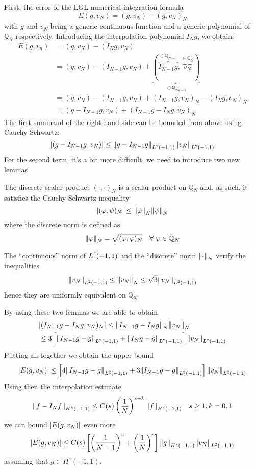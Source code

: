 First, the error of the LGL numerical integration formula 
\[
    E(g, v_N) = (g, v_N) - (g, v_N)_N
\]
with \(g\) and \(v_N\) being a generic continuous function and a generic polynomial of \(\mathbb{Q}_N\) respectively. Introducing the interpolation polynomial \(I_Ng\), we obtain:
\begin{align*}
    E(g, v_n) &= (g, v_N) - (I_Ng, v_N) \\
    &= (g, v_N) - (I_{N-1}g, v_N) + \underbrace{(\overbrace{I_{N-1}g}^{\in \mathbb{Q}_{N-1}}, \overbrace{v_N}^{\in \mathbb{Q}_N})}_{\in \mathbb{Q}_{2N-1}} \\
    &= (g, v_N) - (I_{N-1}g, v_N) +(I_{N-1}g, v_N)_N - (I_{N}g, v_N)_N \\
    &= (g - I_{N-1}g, v_N) + (I_{N-1}g - I_N g, v_N)_N
\end{align*}
The first summand of the right-hand side can be bounded from above using Cauchy-Schwartz:
\[
    \abs{(g-I_{N-1}g, v_N)} \leq \norm{g-I_{N-1}g}_{L^2(-1,1)}\norm{v_N}_{L^2(-1,1)}
\]
For the second term, it's a bit more difficult, we need to introduce two new lemmas
\begin{lemma}
    The discrete scalar product \((\cdot, \cdot)_N\) is a scalar product on \(\mathbb{Q}_N\) and, as such, it satisfies the Cauchy-Schwartz inequality
    \[
        \abs{(\varphi, \psi)_N} \leq \norm{\varphi}_N \norm{\psi}_N
    \]
    where the discrete norm is defined as 
    \[
        \norm{\varphi}_N = \sqrt{(\varphi, \varphi)_N} \quad \forall \; \varphi \in \mathbb{Q}_N
    \]
\end{lemma}
\begin{lemma}
    The ``continuous'' norm of \(L^"(-1,1)\) and the ``discrete'' norm \(\norm{\cdot}_N\) verify the inequalities
    \[
        \norm{v_N}_{L^2(-1,1)} \leq \norm{v_N}_N \leq \sqrt{3}\norm{v_N}_{L^2(-1,1)}
    \]
    hence they are uniformly equivalent on \(\mathbb{Q}_N\)
\end{lemma}
By using these two lemmas we are able to obtain 
\begin{equation*}
    \begin{split}
        &\abs{(I_{N-1}g - I_Ng, v_N)_N} \leq \norm{I_{N-1}g - I_Ng}_N \norm{v_N}_N  \\
        &\leq 3 \left[\norm{I_{N-1}g-g}_{L^2(-1,1)} + \norm{I_{N}g-g}_{L^2(-1,1)}\right] \norm{v_N}_{L^2(-1,1)}
    \end{split}
\end{equation*}
Putting all together we obtain the upper bound 
\[
    \abs{E(g,v_N)} \leq \left[4\norm{I_{N-1}g-g}_{L^2(-1,1)} + 3 \norm{I_{N-1}g-g}_{L^2(-1,1)} \right] \norm{v_N}_{L^2(-1,1)}
\]
Using then the interpolation estimate 
\[
    \norm{f- I_Nf}_{H^k(-1,1)} \leq C(s)\left(\frac{1}{N}\right)^{s-k} \norm{f}_{H^s(-1,1)} \quad s \geq 1, k = 0,1
\]
we can bound \(\abs{E(g,v_N)}\) even more
\[
    \abs{E(g,v_N)} \leq C(s)\left[\left(\frac{1}{N-1}\right)^s + \left(\frac{1}{N}\right)^s\right] \norm{g}_{H^s(-1,1)} \norm{v_N}_{L^2(-1,1)}
\]
assuming that \(g \in H^s(-1,1)\).

